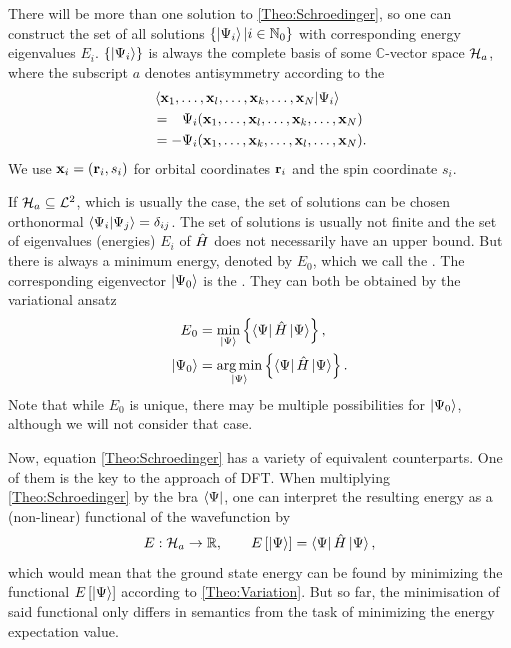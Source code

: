 \documentclass[8.5pt,twoside,twocolumn]{article}
\renewcommand\Hil{\enmat{\mathcal H_a}}
\renewcommand\r{\bo r}
\theoremstyle{standard}
\begin{document}
There will be more than one solution to \eqref{Theo:Schroedinger}, so one can
construct the set of all solutions $\left\{{\left|\Psi{_i}\right\rangle | i \in \mathbb{N}_0} \right\}$ with
corresponding energy eigenvalues $E_i$. $\left\{{\left|\Psi{_i}\right\rangle} \right\}$ is always the complete
basis of some $\mathbb C$-vector space $\Hil$, where the subscript $a$ denotes
antisymmetry according to the 
\begin{equation}
\begin{aligned}
 &\bkt{\x_1,\ldots,\x_l,\ldots,\x_k,\ldots,\x_N | \Psi_i } \\
 &=\ph - \Psi_i(\x_1,\ldots,\x_l,\ldots,\x_k,\ldots,\x_N) \\
 &= - \Psi_i(\x_1,\ldots,\x_k,\ldots,\x_l,\ldots,\x_N).
\end{aligned}
\label{Theo:Pauli}
\end{equation}
We use $\x_i=(\r_i,s_i)$ for orbital coordinates $\r_i$ and the spin coordinate $s_i$.

 If $\Hil \suseq \mathcal {L}^2$, which is usually the case,
the set of solutions can be chosen orthonormal $\left\langle{\Psi_i | \Psi_j}\right\rangle = \delta_{ij}$.
The set of solutions is usually not finite and the set of eigenvalues (energies) $E_i$ of $\hat{H}$
does not necessarily have an upper bound. But there is always a minimum energy,
denoted by $E_0$, which we call the . The corresponding eigenvector 
$\left|\Psi{_0}\right\rangle$ is the . They can both be obtained by the
variational ansatz
\begin{equation}
\begin{aligned}
 E{_0}&= \min_{\left|\Psi{}\right\rangle} \left\{{ \left\langle\Psi{}\right| \hat{H} \left|\Psi{}\right\rangle} \right\}, \\
 \left|\Psi{_0}\right\rangle&= \operatorname*{arg\,min}_{\left|\Psi{}\right\rangle} \left\{{ \left\langle\Psi{}\right| \hat{H} \left|\Psi{}\right\rangle} \right\}.
\end{aligned}
\label{Theo:Variation}
\end{equation}
Note that while $E_0$ is unique, there may be multiple possibilities for $\left|\Psi{_0}\right\rangle$, although
we will not consider that case.

Now, equation \eqref{Theo:Schroedinger} has a variety of equivalent counterparts. One of them
is the key to the approach of DFT. When multiplying \eqref{Theo:Schroedinger} by the bra $\left\langle\Psi{}\right|$,
one can interpret the resulting energy as a (non-linear) functional of the wavefunction by
\begin{equation}
 E : \Hil \rar \R, \qquad E\ed{\keP{}}=\brP{} \Ha \keP{},
 \label{Theo:WaveFunctional}
\end{equation}
which would mean that the ground state energy can be found by minimizing the functional
$E\left[{\left|\Psi{}\right\rangle}\right]$ according to \eqref{Theo:Variation}. But so far, the minimisation
of said functional only differs in semantics from the task of minimizing the energy expectation value.
\end{document}
